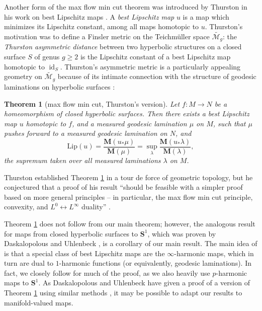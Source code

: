 \documentclass[reqno,11pt]{amsart}
\newcommand{\Sph}{\mathbf S}
\DeclareMathOperator{\id}{id}
\newcommand{\Lip}{\mathrm{Lip}}
\newcommand{\Mass}{\mathbf M}
\newcommand{\dfn}[1]{\emph{#1}\index{#1}}
\newtheorem{theorem}{Theorem}[section]
\theoremstyle{definition}
\numberwithin{equation}{section}
\begin{document}
Another form of the max flow min cut theorem was introduced by Thurston in his work on best Lipschitz maps \cite{Thurston98}.
A \dfn{best Lipschitz map} $u$ is a map which minimizes its Lipschitz constant, among all maps homotopic to $u$.
Thurston's motivation was to define a Finsler metric on the Teichm\"uller space $\widetilde{\mathscr M_g}$: the \dfn{Thurston asymmetric distance} between two hyperbolic structures on a closed surface $S$ of genus $g \geq 2$ is the Lipschitz constant of a best Lipschitz map homotopic to $\id_S$.
Thurston's asymmetric metric is a particularly appealing geometry on $\widetilde{\mathscr M_g}$ because of its intimate connection with the structure of geodesic laminations on hyperbolic surfaces \cite{Thurston98, Gu_ritaud_2017}:

\begin{theorem}[max flow min cut, Thurston's version]\label{existence of thurston lamination}
Let $f: M \to N$ be a homeomorphism of closed hyperbolic surfaces.
Then there exists a best Lipschitz map $u$ homotopic to $f$, and a measured geodesic lamination $\mu$ on $M$, such that $\mu$ pushes forward to a measured geodesic lamination on $N$, and
\begin{equation}\label{L is K}
	\Lip(u) = \frac{\Mass(u_* \mu)}{\Mass(\mu)} = \sup_\lambda \frac{\Mass(u_* \lambda)}{\Mass(\lambda)},
\end{equation}
the supremum taken over all measured laminations $\lambda$ on $M$.
\end{theorem}

Thurston established Theorem \ref{existence of thurston lamination} in a tour de force of geometric topology, but he conjectured that a proof of his result ``should be feasible with a simpler proof based on more general principles -- in particular, the max flow min cut principle, convexity, and $L^0 \leftrightarrow L^\infty$ duality'' \cite[Abstract]{Thurston98}.

Theorem \ref{existence of thurston lamination} does not follow from our main theorem; however, the analogous result for maps from closed hyperbolic surfaces to $\Sph^1$, which was proven by Daskalopolous and Uhlenbeck \cite{daskalopoulos2020transverse}, is a corollary of our main result.
The main idea of \cite{daskalopoulos2020transverse} is that a special class of best Lipschitz maps are the $\infty$-harmonic maps, which in turn are dual to $1$-harmonic functions (or equivalently, geodesic laminations).
In fact, we closely follow \cite{daskalopoulos2020transverse} for much of the proof, as we also heavily use $p$-harmonic maps to $\Sph^1$.
As Daskalopolous and Uhlenbeck have given a proof of a version of Theorem \ref{existence of thurston lamination} using similar methods \cite{daskalopoulos2022,daskalopoulos2023}, it may be possible to adapt our results to manifold-valued maps.
\end{document}
